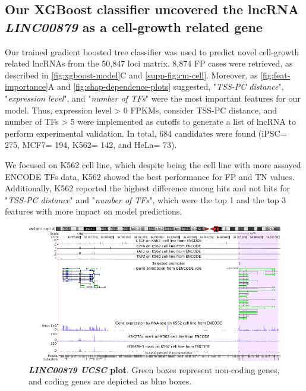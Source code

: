 \clearpage

\subsection{Our XGBoost classifier uncovered the lncRNA \textit{LINC00879} as a cell-growth related gene}
\label{sec:case-study}

Our trained gradient boosted tree classifier was used to predict novel cell-growth related lncRNAs from the 50,847 loci matrix. 8,874 FP cases were retrieved, as described in \autoref{fig:xgboost-model}C and \autoref{supp-fig:cm-cell}. Moreover, as \autoref{fig:feat-importance}A and \autoref{fig:shap-dependence-plots} suggested, "\textit{TSS-PC distance}", "\textit{expression level}", and "\textit{number of TFs}" were the most important features for our model. Thus, expression level > 0 FPKMs, consider TSS-PC distance, and number of TFs > 5 were implemented as cutoffs to generate a list of lncRNA to perform experimental validation. In total, 684 candidates were found (iPSC= 275, MCF7= 194, K562= 142, and HeLa= 73).

We focused on K562 cell line, which despite being the cell line with more assayed ENCODE TFs data, K562 showed the best performance for FP and TN values. Additionally, K562 reported the highest difference among hits and not hits for "\textit{TSS-PC distance}" and "\textit{number of TFs}", which were the top 1 and the top 3 features with more impact on model predictions. 

\begin{figure}[ht!]
  \centering
  \includegraphics[scale=0.9]{plots/results/ml/ucsc.linc00879.v2.pdf}
  \caption[\textit{LINC00879 UCSC} plot]{\textbf{\textit{LINC00879 UCSC} plot}. Green boxes represent non-coding genes, and coding genes are depicted as blue boxes.}
  \label{fig:ucsc-linc-plot}
\end{figure}

